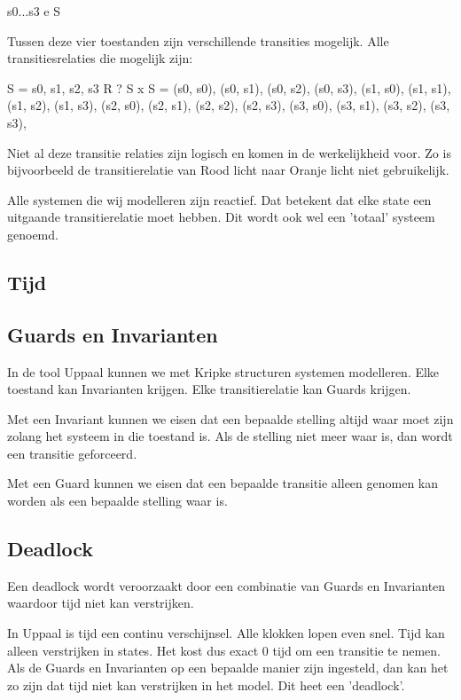 \documentclass{article}
\begin{document}
		s0...s3 e S

		Tussen deze vier toestanden zijn verschillende transities mogelijk. Alle transitiesrelaties die mogelijk zijn:

		S = {s0, s1, s2, s3}
		R ? S x S = {
			(s0, s0), (s0, s1), (s0, s2), (s0, s3),
			(s1, s0), (s1, s1), (s1, s2), (s1, s3),
			(s2, s0), (s2, s1), (s2, s2), (s2, s3),
			(s3, s0), (s3, s1), (s3, s2), (s3, s3),
		}

		Niet al deze transitie relaties zijn logisch en komen in de werkelijkheid voor. Zo is bijvoorbeeld de transitierelatie van Rood licht naar Oranje licht niet gebruikelijk.
		
		Alle systemen die wij modelleren zijn reactief. Dat betekent dat elke state een uitgaande transitierelatie moet hebben. Dit wordt ook wel een 'totaal' systeem genoemd.
		
		\subsection{Tijd}
		
		
		
		\subsection{Guards en Invarianten}
		
		In de tool Uppaal kunnen we met Kripke structuren systemen modelleren. Elke toestand kan Invarianten krijgen. Elke transitierelatie kan Guards krijgen.
		
		Met een Invariant kunnen we eisen dat een bepaalde stelling altijd waar moet zijn zolang het systeem in die toestand is. Als de stelling niet meer waar is, dan wordt een transitie geforceerd.

		Met een Guard kunnen we eisen dat een bepaalde transitie alleen genomen kan worden als een bepaalde stelling waar is.
		
		\subsection{Deadlock}
		
		Een deadlock wordt veroorzaakt door een combinatie van Guards en Invarianten waardoor tijd niet kan verstrijken.

		In Uppaal is tijd een continu verschijnsel. Alle klokken lopen even snel. Tijd kan alleen verstrijken in states. Het kost dus exact 0 tijd om een transitie te nemen. Als de Guards en Invarianten op een bepaalde manier zijn ingesteld, dan kan het zo zijn dat tijd niet kan verstrijken in het model. Dit heet een 'deadlock'.
		
\end{document}
